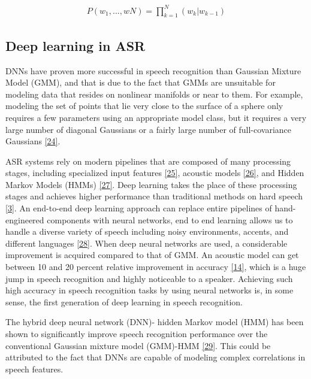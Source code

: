 \documentclass[
  a4paper,
]{article}
\begin{document}
\begin{align}
P(w_1,...,wN) = \prod_{k=1}^N(w_k|w_{k-1})
\end{align}

\hypertarget{deep-learning-in-asr}{%
\subsection{Deep learning in ASR}\label{deep-learning-in-asr}}

DNNs have proven more successful in speech recognition than Gaussian
Mixture Model (GMM), and that is due to the fact that GMMs are
unsuitable for modeling data that resides on nonlinear manifolds or near
to them. For example, modeling the set of points that lie very close to
the surface of a sphere only requires a few parameters using an
appropriate model class, but it requires a very large number of diagonal
Gaussians or a fairly large number of full-covariance Gaussians
\protect\hyperlink{ref-6296526}{{[}24{]}}.

ASR systems rely on modern pipelines that are composed of many
processing stages, including specialized input features
\protect\hyperlink{ref-862023}{{[}25{]}}, acoustic models
\protect\hyperlink{ref-sak2015fast}{{[}26{]}}, and Hidden Markov Models
(HMMs) \protect\hyperlink{ref-5745027}{{[}27{]}}. Deep learning takes
the place of these processing stages and achieves higher performance
than traditional methods on hard speech
\protect\hyperlink{ref-hannun2014deep}{{[}3{]}}. An end-to-end deep
learning approach can replace entire pipelines of hand-engineered
components with neural networks, end to end learning allows us to handle
a diverse variety of speech including noisy environments, accents, and
different languages \protect\hyperlink{ref-amodei2015deep}{{[}28{]}}.
When deep neural networks are used, a considerable improvement is
acquired compared to that of GMM. An acoustic model can get between 10
and 20 percent relative improvement in accuracy
\protect\hyperlink{ref-inproceedings}{{[}14{]}}, which is a huge jump in
speech recognition and highly noticeable to a speaker. Achieving such
high accuracy in speech recognition tasks by using neural networks is,
in some sense, the first generation of deep learning in speech
recognition.

The hybrid deep neural network (DNN)- hidden Markov model (HMM) has been
shown to significantly improve speech recognition performance over the
conventional Gaussian mixture model (GMM)-HMM
\protect\hyperlink{ref-6857341}{{[}29{]}}. This could be attributed to
the fact that DNNs are capable of modeling complex correlations in
speech features.
\end{document}
